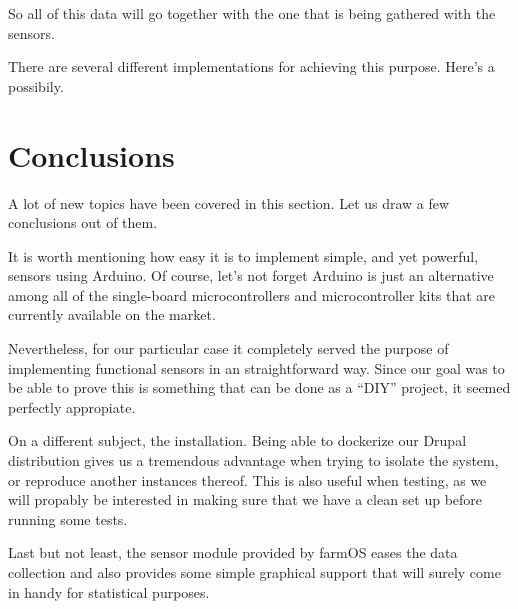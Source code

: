 \vspace{7mm}
So all of this data will go together with the one that is being gathered with the sensors.

\vspace{5mm}
There are several different implementations for achieving this purpose. Here's a possibily.


\newpage
\section{Conclusions}
A lot of new topics have been covered in this section. Let us draw a few conclusions out of them.

It is worth mentioning how easy it is to implement simple, and yet powerful, sensors using Arduino. Of course, let's not forget Arduino is just an alternative among all of the single-board microcontrollers and microcontroller kits that are currently available on the market.

Nevertheless, for our particular case it completely served the purpose of implementing functional sensors in an straightforward way. Since our goal was to be able to prove this is something that can be done as a ``DIY'' project\cite{diy}, it seemed perfectly appropiate.

On a different subject, the installation. Being able to dockerize our Drupal distribution gives us a tremendous advantage when trying to isolate the system, or reproduce another instances thereof. This is also useful when testing, as we will propably be interested in making sure that we have a clean set up before running some tests.

Last but not least, the sensor module provided by farmOS eases the data collection and also provides some simple graphical support that will surely come in handy for statistical purposes.

